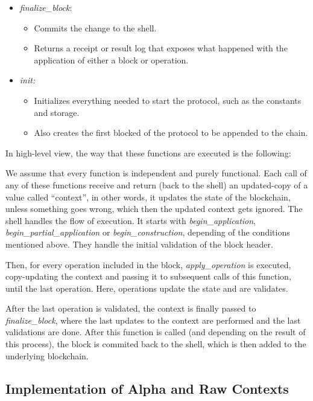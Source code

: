 \begin{itemize}
    \item \emph{finalize\_block}:
        \begin{itemize}
            \item Commits the change to the shell.
            \item Returns a receipt or result log that exposes what happened with the application of either a block or operation.
        \end{itemize}
    \item \emph{init:}
        \begin{itemize}
            \item Initializes everything needed to start the protocol, such as the constants and storage.
            \item Also creates the first blocked of the protocol to be appended to the chain.
        \end{itemize}
    \end{itemize}


In high-level view, the way that these functions are executed is the following: 

We assume that every function is independent and purely functional. Each call of any of these functions receive and return (back to the shell) an updated-copy of a value called ``context'', in other words, it updates the state of the blockchain, unless something goes wrong, which then the updated context gets ignored.
The shell handles the flow of execution.
It starts with \emph{begin\_application}, \emph{begin\_partial\_application} or \emph{begin\_construction}, depending of the conditions mentioned above. They handle the initial validation of the block header.

Then, for every operation included in the block, \emph{apply\_operation} is executed, copy-updating the context and passing it to subsequent calls of this function, until the last operation. Here, operations update the state and are validates.

After the last operation is validated, the context is finally passed to \emph{finalize\_block}, where the last updates to the context are performed and the last validations are done. After this function is called (and depending on the result of this process), the block is commited back to the shell, which is then added to the underlying blockchain.



\subsection*{Implementation of Alpha and Raw Contexts}

